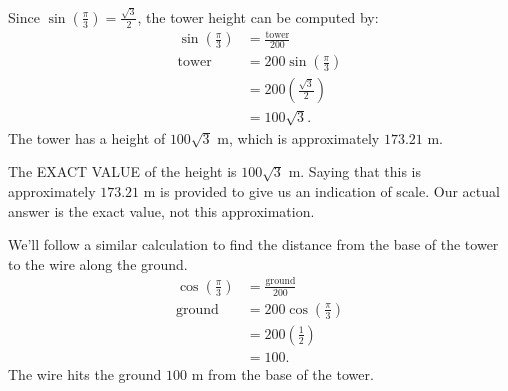 \documentclass[nooutcomes]{ximera}
\begin{document}
\begin{example}
\begin{explanation}
		Since $\sin\left( \frac{\pi}{3} \right) = \frac{\sqrt{3}}{2}$, the tower height can be computed by:
		\begin{align*}
			\sin\left(\frac{\pi}{3}\right) &= \frac{\text{tower}}{200}\\
			\text{tower} &= 200\sin\left(\frac{\pi}{3}\right)\\ 
				&= 200\left( \frac{\sqrt{3}}{2} \right)\\
				&= 100\sqrt{3}.
		\end{align*}
		The tower has a height of $100\sqrt{3}$ m, which is approximately $173.21$ m. 
		\begin{callout}
			The EXACT VALUE of the height is $100\sqrt{3}$ m. Saying that this is approximately $173.21$ m is provided to give us an indication of scale.
			Our actual answer is the exact value, not this approximation.
		\end{callout}
		We'll follow a similar calculation to find the distance from the base of the tower to the wire along the ground.
		\begin{align*}
			\cos\left(\frac{\pi}{3}\right) &= \frac{\text{ground}}{200}\\
			\text{ground} &= 200\cos\left(\frac{\pi}{3}\right)\\ 
				&= 200\left( \frac{1}{2} \right)\\
				&= 100.
		\end{align*}
		The wire hits the ground $100$ m from the base of the tower.
	\end{explanation}
\end{example}
\end{document}

